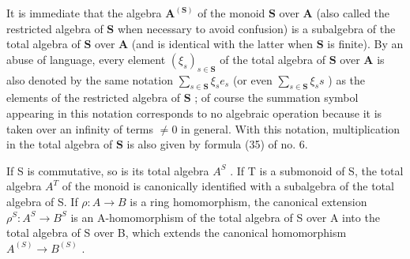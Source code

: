 It is immediate that the algebra \(\mathbf{A}^{(\mathbf{S})}\) of the monoid \(\mathbf{S}\) over \(\mathbf{A}\) (also called the restricted algebra of \(\mathbf{S}\) when necessary to avoid confusion) is a subalgebra of the total algebra of \(\mathbf{S}\) over \(\mathbf{A}\) (and is identical with the latter when \(\mathbf{S}\) is finite). By an abuse of language, every element \((\xi_s)_{s \in \mathbf{S}}\) of the total algebra of \(\mathbf{S}\) over \(\mathbf{A}\) is also denoted by the same notation \(\sum_{s \in \mathbf{S}} \xi_s e_s\) (or even \(\sum_{s \in \mathbf{S}} \xi_s s\) ) as the elements of the restricted algebra of \(\mathbf{S}\) ; of course the summation symbol appearing in this notation corresponds to no algebraic operation because it is taken over an infinity of terms \(\neq 0\) in general. With this notation, multiplication in the total algebra of \(\mathbf{S}\) is also given by formula (35) of no. 6.

If S is commutative, so is its total algebra \(A^{S}\) . If T is a submonoid of S, the total algebra \(A^{T}\) of the monoid is canonically identified with a subalgebra of the total algebra of S. If \(\rho: A \to B\) is a ring homomorphism, the canonical extension \(\rho^{S}: A^{S} \to B^{S}\) is an A-homomorphism of the total algebra of S over A into the total algebra of S over B, which extends the canonical homomorphism \(A^{(S)} \to B^{(S)}\) .
\relax{}
